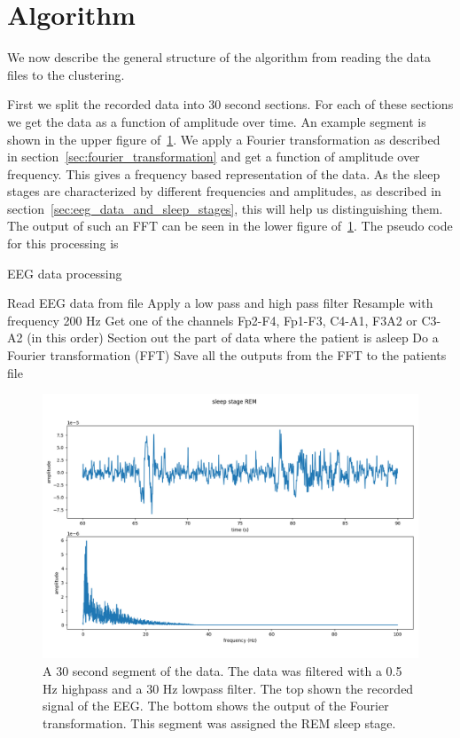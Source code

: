 \section{Algorithm}
\label{sec:algorithm}

We now describe the general structure of the algorithm from reading the data files to the clustering.

First we split the recorded data into 30 second sections. For each of these sections we get the data as a function of amplitude over time. An example segment is shown in the upper figure of~\ref{fig:example_30s_segment}. We apply a Fourier transformation as described in section~\ref{sec:fourier_transformation} and get a function of amplitude over frequency. This gives a frequency based representation of the data. As the sleep stages are characterized by different frequencies and amplitudes, as described in section~\ref{sec:eeg_data_and_sleep_stages}, this will help us distinguishing them. The output of such an FFT can be seen in the lower figure of~\ref{fig:example_30s_segment}. The pseudo code for this processing is 

\begin{algorithm}
	\caption{EEG data processing}\label{alg:process_eeg_data}
	\begin{algorithmic}
		\State Read EEG data from file
		\State Apply a low pass and high pass filter
		\State Resample with frequency 200 Hz
		\State Get one of the channels Fp2-F4, Fp1-F3, C4-A1, F3A2 or C3-A2 (in this order)
		\State Section out the part of data where the patient is asleep
		\State Do a Fourier transformation (FFT)
		\EndFor
		\State Save all the outputs from the FFT to the patients file
		\EndFor
	\end{algorithmic}
\end{algorithm}


\begin{figure}
	\centering
	\includegraphics[width=\linewidth]{figs/example_30s_segment}
	\caption{A 30 second segment of the data. The data was filtered with a 0.5 Hz highpass and a 30 Hz lowpass filter. The top shown the recorded signal of the EEG. The bottom shows the output of the Fourier transformation. This segment was assigned the REM sleep stage.}
	\label{fig:example_30s_segment}
\end{figure}


